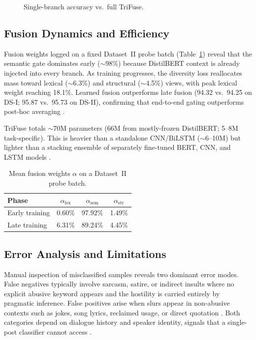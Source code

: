 \documentclass[10pt,twocolumn,a4paper]{article}
\begin{document}
\begin{figure}[!t]
\centering

\caption{Single-branch accuracy vs.\ full TriFuse.}
\label{fig:feature_effect}
\end{figure}

\subsection{Fusion Dynamics and Efficiency}\label{subsec:fusion_weights}

Fusion weights logged on a fixed Dataset~II probe batch (Table~\ref{tab:fusion_weights}) reveal that the semantic gate dominates early ($\sim$98\%) because DistilBERT context is already injected into every branch. As training progresses, the diversity loss reallocates mass toward lexical ($\sim$6.3\%) and structural ($\sim$4.5\%) views, with peak lexical weight reaching 18.1\%. Learned fusion outperforms late fusion (94.32 vs.\ 94.25 on DS-I; 95.87 vs.\ 95.73 on DS-II), confirming that end-to-end gating outperforms post-hoc averaging \citep{ref19}.

TriFuse totals $\sim$70M parameters (66M from mostly-frozen DistilBERT; 5--8M task-specific). This is heavier than a standalone CNN/BiLSTM ($\sim$6--10M) but lighter than a stacking ensemble of separately fine-tuned BERT, CNN, and LSTM models \citep{ref14}.

\begin{table}[!t]
\caption{Mean fusion weights $\alpha$ on a Dataset~II probe batch.}
\label{tab:fusion_weights}
\centering
\begin{tabular}{|l|c|c|c|}
\hline
Phase & $\alpha_{\mathrm{lex}}$ & $\alpha_{\mathrm{sem}}$ & $\alpha_{\mathrm{str}}$ \\
\hline
Early training & 0.60\% & 97.92\% & 1.49\% \\
Late training & 6.31\% & 89.24\% & 4.45\% \\
\hline
\end{tabular}
\end{table}

\subsection{Error Analysis and Limitations}\label{subsec:limitations}

Manual inspection of misclassified samples reveals two dominant error modes. False negatives typically involve sarcasm, satire, or indirect insults where no explicit abusive keyword appears and the hostility is carried entirely by pragmatic inference. False positives arise when slurs appear in non-abusive contexts such as jokes, song lyrics, reclaimed usage, or direct quotation \citep{ref37,ref2}. Both categories depend on dialogue history and speaker identity, signals that a single-post classifier cannot access \citep{ref38}.
\end{document}
